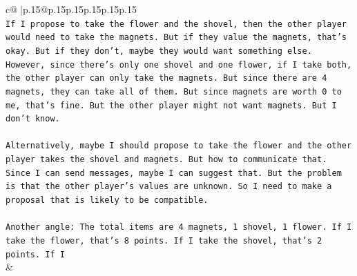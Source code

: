 \documentclass{article}
\begin{document}
{\begin{supertabular}{c@{$\;$}|p{.15\linewidth}@{}p{.15\linewidth}p{.15\linewidth}p{.15\linewidth}p{.15\linewidth}p{.15\linewidth}}
{{{\\ 
\texttt{If I propose to take the flower and the shovel, then the other player would need to take the magnets. But if they value the magnets, that's okay. But if they don't, maybe they would want something else. However, since there's only one shovel and one flower, if I take both, the other player can only take the magnets. But since there are 4 magnets, they can take all of them. But since magnets are worth 0 to me, that's fine. But the other player might not want magnets. But I don't know.} \\
\\ 
\texttt{Alternatively, maybe I should propose to take the flower and the other player takes the shovel and magnets. But how to communicate that. Since I can send messages, maybe I can suggest that. But the problem is that the other player's values are unknown. So I need to make a proposal that is likely to be compatible.} \\
\\ 
\texttt{Another angle: The total items are 4 magnets, 1 shovel, 1 flower. If I take the flower, that's 8 points. If I take the shovel, that's 2 points. If I} \\
            }
        }
    }
    & \\ \\


\end{supertabular}}
\end{document}
